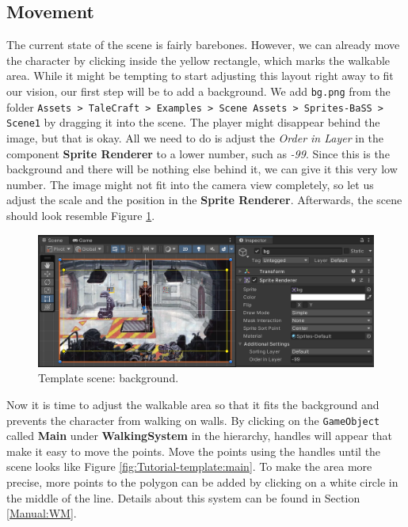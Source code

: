 \subsection{Movement}
The current state of the scene is fairly barebones. However, we can already move the character by clicking inside the yellow rectangle, which marks the walkable area. While it might be tempting to start adjusting this layout right away to fit our vision, our first step will be to add a background.  We add \verb|bg.png|  from the folder \texttt{Assets > TaleCraft > Examples > Scene Assets > Sprites-BaSS > Scene1} by dragging it into the scene. The player might disappear behind the image, but that is okay. All we need to do is adjust the \textit{Order in Layer} in the component \textbf{Sprite Renderer} to a lower number, such as \textit{-99}. Since this is the background and there will be nothing else behind it, we can give it this very low number. The image might not fit into the camera view completely, so let us adjust the scale and the position in the \textbf{Sprite Renderer}. Afterwards, the scene should look resemble Figure \ref{fig:Tutorial-template:bg}.
\begin{figure}[H]
\centering
\includegraphics[width=1\linewidth]{img/User doc/image_2025-07-08_104224540.png}
\caption{Template scene: background.}
\label{fig:Tutorial-template:bg}
\end{figure}

Now it is time to adjust the walkable area so that it fits the background and prevents the character from walking on walls. By clicking on the \verb|GameObject| called \textbf{Main} under \textbf{WalkingSystem} in the hierarchy, handles will appear that make it easy to move the points. Move the points using the handles until the scene looks like Figure \ref{fig:Tutorial-template:main}. To make the area more precise, more points to the polygon can be added by clicking on a white circle in the middle of the line. Details about this system can be found in Section \ref{Manual:WM}.

